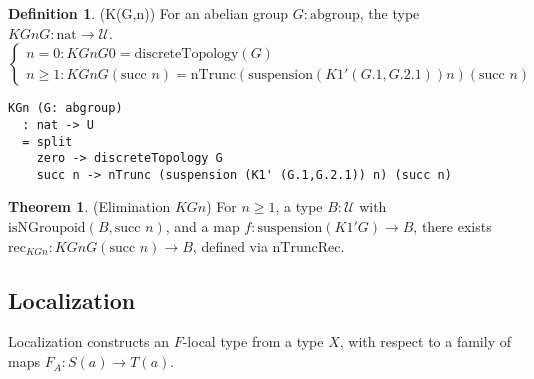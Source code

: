 \documentclass{article}
\theoremstyle{definition}
\newtheorem{theorem}{Theorem}
\newtheorem{definition}{Definition}
\begin{document}
\begin{definition} (K(G,n))
For an abelian group $G : \text{abgroup}$, the type $KGn G : \text{nat} \to \mathcal{U}$.
\[
\begin{cases}
n = 0: KGn G 0 = \text{discreteTopology}(G) \\
n \geq 1: KGn G (\text{succ } n) = \text{nTrunc}(\text{suspension}(K1' (G.1, G.2.1)) n) (\text{succ } n)
\end{cases}
\]
\begin{lstlisting}
KGn (G: abgroup)
  : nat -> U
  = split
    zero -> discreteTopology G
    succ n -> nTrunc (suspension (K1' (G.1,G.2.1)) n) (succ n)
\end{lstlisting}
\end{definition}

\begin{theorem} (Elimination $KGn$)
For $n \geq 1$, a type $B : \mathcal{U}$ with $\text{isNGroupoid}(B, \text{succ } n)$, and a map $f : \text{suspension}(K1' G) \to B$, there exists $\text{rec}_{KGn} : KGn G (\text{succ } n) \to B$, defined via $\text{nTruncRec}$.
\end{theorem}

\newpage

\subsection{Localization}
Localization constructs an $F$-local type from a type $X$, with respect to a family of maps $F_A : S(a) \to T(a)$.
\end{document}

